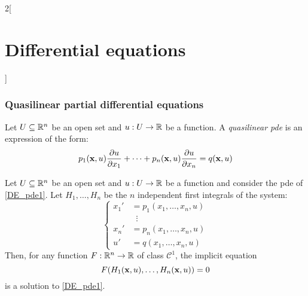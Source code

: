 \documentclass[../../../main.tex]{subfiles}
\begin{document}
\begin{multicols}{2}[\section{Differential equations}]
  \subsubsection{Quasilinear partial differential equations}
  \begin{definition}
    Let $U\subseteq \mathbb{R}^n$ be an open set and $u:U\rightarrow\mathbb{R}$ be a function. A \emph{quasilinear pde} is an expression of the form:
    \begin{equation}\label{DE_pde1}
      p_1(\boldsymbol{\mathrm{x}},u)\pdv{u}{x_1}+\cdots+p_n(\boldsymbol{\mathrm{x}},u)\pdv{u}{x_n}=q(\boldsymbol{\mathrm{x}},u)
    \end{equation}
  \end{definition}
  \begin{theorem}
    Let $U\subseteq \mathbb{R}^n$ be an open set and $u:U\rightarrow\mathbb{R}$ be a function and consider the pde of \cref{DE_pde1}. Let $H_1,\ldots,H_{n}$ be the $n$ independent first integrals of the system:
    $$
      \left\{
      \begin{aligned}
        {x_1}' & =p_1(x_1,\ldots,x_n,u) \\
               & \;\;\vdots             \\
        {x_n}' & =p_n(x_1,\ldots,x_n,u) \\
        {u}'   & = q(x_1,\ldots,x_n,u)
      \end{aligned}
      \right.
    $$
    Then, for any function $F:\mathbb{R}^n\rightarrow\mathbb{R}$ of class $\mathcal{C}^1$, the implicit equation $$F(H_1(\boldsymbol{\mathrm{x}},u),\ldots,H_n(\boldsymbol{\mathrm{x}},u))=0$$ is a solution to \cref{DE_pde1}.
  \end{theorem}

\end{multicols}
\end{document}

